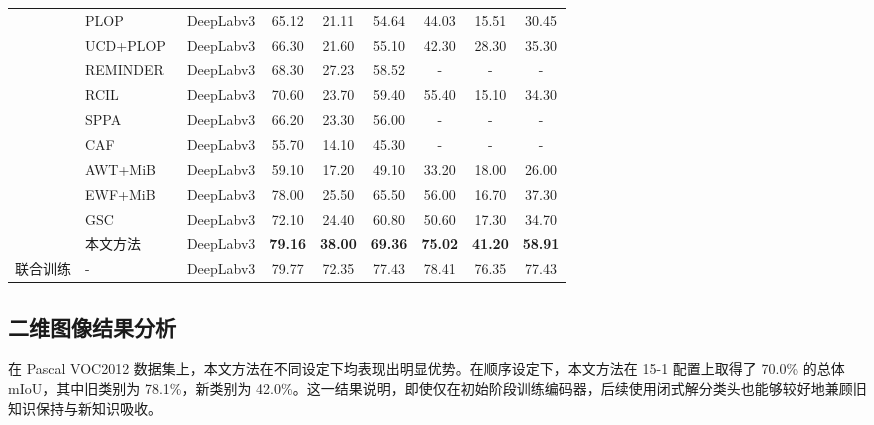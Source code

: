 \begin{table}[htbp]
{\begin{tabular}{@{}llcccc ccc@{}}
                        &PLOP~\cite{douillard2021plop}&DeepLabv3&65.12&21.11&54.64&44.03&15.51&30.45 \\
                        &UCD+PLOP~\cite{UCD}&DeepLabv3&66.30&21.60&55.10&42.30&28.30&35.30\\
                        &REMINDER~\cite{REMINDER} &DeepLabv3&68.30&27.23&58.52&-&-&- \\
                        &RCIL~\cite{RCIL}&DeepLabv3&70.60&23.70&59.40&55.40&15.10&34.30\\
                        &SPPA~\cite{SPPA}&DeepLabv3&66.20&23.30&56.00&-&-&-\\
                        &CAF~\cite{CAF}&DeepLabv3&55.70&14.10&45.30&-&-&-\\
                        &AWT+MiB~\cite{AWT}&DeepLabv3 &59.10&17.20&49.10&33.20&18.00&26.00\\
                        &EWF+MiB~\cite{EWF}&DeepLabv3&78.00&25.50&65.50&56.00&16.70&37.30\\
                        &GSC~\cite{GSC}&DeepLabv3&72.10&24.40&60.80&50.60&17.30&34.70 \\
                    &本文方法&DeepLabv3&\textbf{79.16}&\textbf{38.00}&\textbf{69.36}&\textbf{75.02}&\textbf{41.20}&\textbf{58.91} \\
                        \midrule
                        联合训练 & - & DeepLabv3&79.77&72.35&77.43&78.41&76.35&77.43\\
                        \bottomrule[0.8pt]
            \end{tabular}
    }
  
	\label{table-VOC2012:2}
\end{table}

\subsection{二维图像结果分析}

在 Pascal VOC2012 数据集上，本文方法在不同设定下均表现出明显优势。在顺序设定下，本文方法在 15-1 配置上取得了 70.0\% 的总体 mIoU，其中旧类别为 78.1\%，新类别为 42.0\%。这一结果说明，即使仅在初始阶段训练编码器，后续使用闭式解分类头也能够较好地兼顾旧知识保持与新知识吸收。

